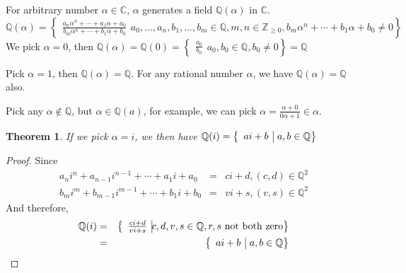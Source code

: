 \documentclass{article}
\theoremstyle{MyNonumberplain}
\theoremstyle{break}
\newtheorem*{proof}{Proof. }
\newcommand{\nin}{\not\in}
\theoremstyle{break}
\newtheorem{theorem}{Theorem}[section]
\theoremstyle{break}
\theoremstyle{definition}
\theoremstyle{break}
\begin{document}
For arbitrary number $\alpha \in \mathbb{C}$, $\alpha$ generates a field
$\mathbb{Q} (\alpha) \text{ in } \mathbb{C}$.
\[ \mathbb{Q} (\alpha) = \left\{ \begin{array}{c|}
    \frac{a_n \alpha^n + \cdots + a_1 \alpha + a_0}{b_m \alpha^n + \cdots +
    b_1 \alpha + b_0}
    \end{array} a_0, \ldots, a_n, b_1, \ldots, b_m \in \mathbb{Q}, m, n \in
    \mathbb{Z}_{\geq 0}, b_m \alpha^n + \cdots + b_1 \alpha + b_0 \neq 0
    \right\} \]
We pick $\alpha = 0$, then $\mathbb{Q} (\alpha) =\mathbb{Q} (0) = \left\{
\begin{array}{c|}
\frac{a_0}{b_0}
\end{array} a_0, b_0 \in \mathbb{Q}, b_0 \neq 0 \right\} =\mathbb{Q}$

Pick $\alpha = 1$, then $\mathbb{Q} (\alpha) =\mathbb{Q}$. For any rational
number $\alpha$, we have $\mathbb{Q} (\alpha) =\mathbb{Q}$ also.

Pick any $\alpha \nin \mathbb{Q}$, but $\alpha \in \mathbb{Q} (a)$, for
example, we can pick $\alpha = \frac{\alpha + 0}{0 \alpha + 1} \in \alpha$.



\begin{thmbox}
    \begin{theorem}
        If we pick $\alpha = i$, we then have $\mathbb{Q} (i) = \left\{\begin{array}{c|}
            a i + b
            \end{array} \hspace{0.4em} a, b \in \mathbb{Q} \right\}$
    \end{theorem}
    \begin{prfbox}
        \begin{proof}
            Since
            \begin{eqnarray*}
              a_n i^n + a_{n - 1} i^{n - 1} + \cdots + a_1 i + a_0 & = & c i + d, (c, d)
              \in \mathbb{Q}^2\\
              b_m i^m + b_{m - 1} i^{m - 1} + \cdots + b_1 i + b_0 & = & v i + s, (v, s)
              \in \mathbb{Q}^2
            \end{eqnarray*}
            And therefore,
            \begin{eqnarray*}
              \mathbb{Q} (i) & = & \left\{ \begin{array}{c|}
                \frac{c i + d}{v i + s}
              \end{array} c, d, v, s \in \mathbb{Q}, r, s \text{ not both zero} \right\}\\
              & = & \left\{ \begin{array}{c|}
                a i + b
              \end{array} \hspace{0.4em} a, b \in \mathbb{Q} \right\}
            \end{eqnarray*}
        \end{proof}
    \end{prfbox}
\end{thmbox}
\end{document}
